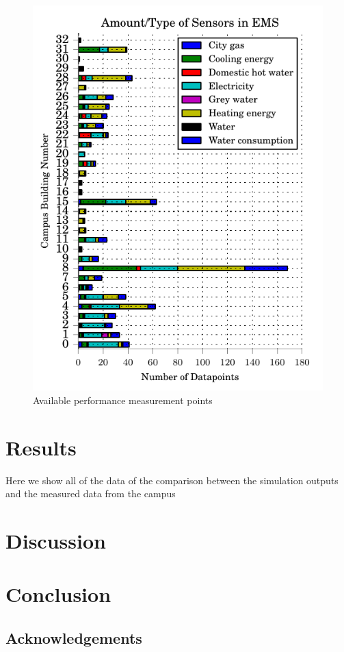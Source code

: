 \documentclass{tBPS2e}
\theoremstyle{plain}
\theoremstyle{definition}
\theoremstyle{remark}
\begin{document}
\begin{figure}
\centering
\includegraphics[scale=1.0]{figures/pointbreakdown_anon}
\caption{Available performance measurement points}
\label{fig:pointgraph}
\end{figure}

\section{Results}
{\color{red}Here we show all of the data of the comparison between the simulation outputs and the measured data from the campus}

\section{Discussion}

\section{Conclusion}

\subsection{Acknowledgements}




\end{document}
